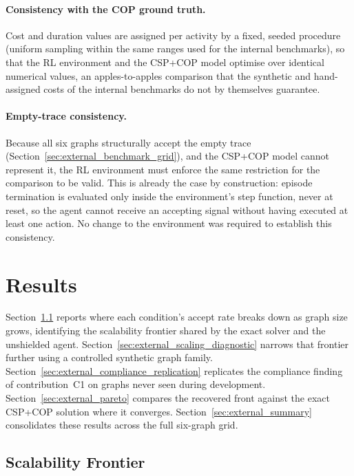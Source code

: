 \paragraph{Consistency with the COP ground truth.}
Cost and duration values are assigned per activity by a fixed,
seeded procedure (uniform sampling within the same ranges used for the
internal benchmarks), so that the \ac{RL} environment and the CSP+COP
model optimise over identical numerical values, an apples-to-apples
comparison that the synthetic and hand-assigned costs of the internal
benchmarks do not by themselves guarantee.

\paragraph{Empty-trace consistency.}
Because all six graphs structurally accept the empty trace
(Section~\ref{sec:external_benchmark_grid}), and the CSP+COP model
cannot represent it, the \ac{RL} environment must enforce the same
restriction for the comparison to be valid. This is already the case
by construction: episode termination is evaluated only inside the
environment's step function, never at reset, so the agent cannot
receive an accepting signal without having executed at least one
action. No change to the environment was required to establish this
consistency.

\section{Results}
\label{sec:external_results}

Section~\ref{sec:external_scalability} reports where each condition's
accept rate breaks down as graph size grows, identifying the
scalability frontier shared by the exact solver and the unshielded
agent. Section~\ref{sec:external_scaling_diagnostic} narrows that
frontier further using a controlled synthetic graph family.
Section~\ref{sec:external_compliance_replication} replicates the
compliance finding of contribution~C1 on graphs never seen during
development. Section~\ref{sec:external_pareto} compares the recovered
front against the exact CSP+COP solution where it converges.
Section~\ref{sec:external_summary} consolidates these results across
the full six-graph grid.

\subsection{Scalability Frontier}
\label{sec:external_scalability}

